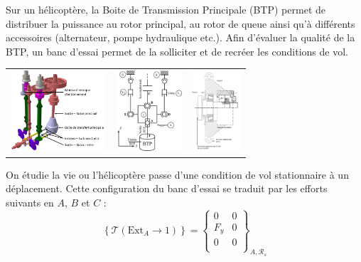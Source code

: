 \documentclass[10pt,fleqn]{article} %
\begin{document}

\vspace{7cm}
\pagestyle{fancy}
\thispagestyle{plain}


\def\columnseprulecolor{\color{ocre}}
\setlength{\columnseprule}{0.4pt} 
\ifprof
\else
\begin{multicols}{2}
\fi

Sur un hélicoptère, la Boite de Transmission Principale (BTP) permet de distribuer la puissance au rotor principal, au rotor de queue ainsi qu'à différents accessoires (alternateur, pompe hydraulique etc.). Afin d'évaluer la qualité de la BTP, un banc d'essai permet de la solliciter et de recréer les conditions de vol. 

\begin{center}
\begin{tabular}{ccc}
\includegraphics[height=3cm]{images/fig_01} &
\includegraphics[height=3cm]{images/fig_02} &
\includegraphics[height=3cm]{images/fig_03}
\end{tabular}
\end{center}
On étudie la vie ou l'hélicoptère passe d'une condition de vol stationnaire à un déplacement. Cette configuration du banc d'essai se traduit par les efforts suivants en $A$, $B$ et $C$ : 
$$
\left\{\mathcal{T} \left( \text{Ext}_A \rightarrow 1\right) \right\} =
\begin{Bmatrix}
0 & 0 \\
F_y & 0 \\
0 & 0 \\
\end{Bmatrix}_{A,\mathcal{R}_s}
$$
\end{multicols}
\end{document}
